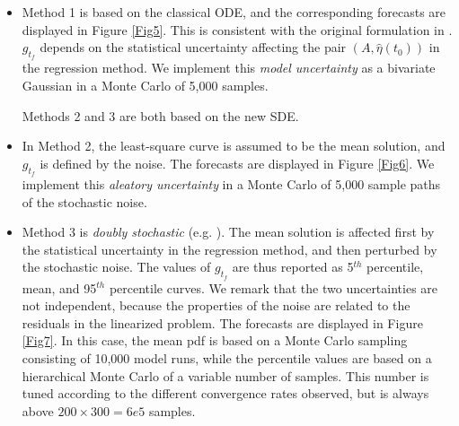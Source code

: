 \documentclass{article}
\begin{document}
\begin{itemize}
\item Method 1 is based on the classical ODE, and the corresponding forecasts are displayed in Figure \ref{Fig5}. This is consistent with the original formulation in \cite{Voight1988}. $g_{t_f}$ depends on the statistical uncertainty affecting the pair $(A, \hat\eta(t_0))$ in the regression method. We implement this \emph{model uncertainty} as a bivariate Gaussian in a Monte Carlo of 5,000 samples.

Methods 2 and 3 are both based on the new SDE.
\item In Method 2, the least-square curve is assumed to be the mean solution, and $g_{t_f}$ is defined by the noise. The forecasts are displayed in Figure \ref{Fig6}. We implement this \emph{aleatory uncertainty} in a Monte Carlo of 5,000 sample paths of the stochastic noise.

\item Method 3 is \emph{doubly stochastic} (e.g. \cite{Bevilacqua2016}). The mean solution is affected first by the statistical uncertainty in the regression method, and then perturbed by the stochastic noise. The values of $g_{t_f}$ are thus reported as 5$^{th}$ percentile, mean, and 95$^{th}$ percentile curves. We remark that the two uncertainties are not independent, because the properties of the noise are related to the residuals in the linearized problem. The forecasts are displayed in Figure \ref{Fig7}. In this case, the mean pdf is based on a Monte Carlo sampling consisting of 10,000 model runs, while the percentile values are based on a hierarchical Monte Carlo of a variable number of samples. This number is tuned according to the different convergence rates observed, but is always above $200\times300=6e5$ samples.
\end{itemize}
\end{document}
